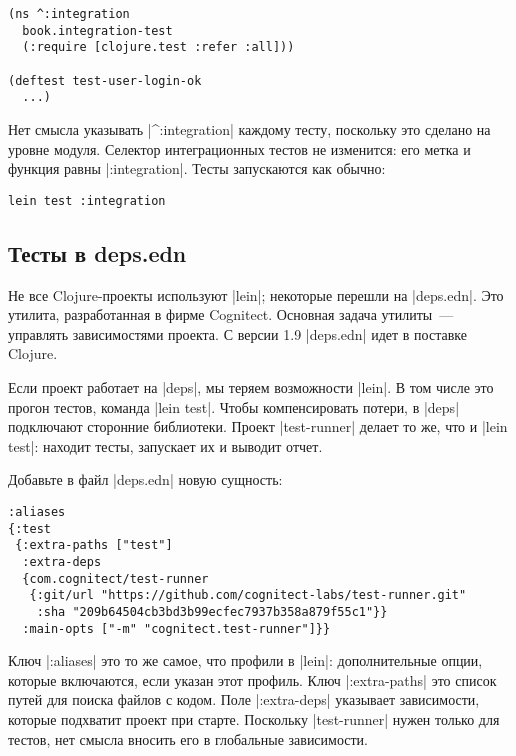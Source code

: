 \begin{verbatim}
(ns ^:integration
  book.integration-test
  (:require [clojure.test :refer :all]))

(deftest test-user-login-ok
  ...)
\end{verbatim}

Нет смысла указывать \spverb|^:integration| каждому тесту, поскольку это сделано
на уровне модуля. Селектор интеграционных тестов не изменится: его метка и
функция равны \spverb|:integration|. Тесты запускаются как обычно:

\begin{verbatim}
lein test :integration
\end{verbatim}

\subsection{Тесты в deps.edn}

Не все Clojure-проекты используют \spverb|lein|; некоторые перешли на
\spverb|deps.edn|. Это утилита,
разработанная в фирме Cognitect. Основная задача утилиты~--- управлять
зависимостями проекта. С версии 1.9 \spverb|deps.edn| идет в поставке Clojure.

Если проект работает на \spverb|deps|, мы теряем возможности \spverb|lein|. В
том числе это прогон тестов, команда \spverb|lein test|. Чтобы компенсировать
потери, в \spverb|deps| подключают сторонние библиотеки. Проект
\spverb|test-runner|
делает то же, что и \spverb|lein test|: находит тесты, запускает их и выводит
отчет.

Добавьте в файл \spverb|deps.edn| новую сущность:

\begin{verbatim}
:aliases
{:test
 {:extra-paths ["test"]
  :extra-deps
  {com.cognitect/test-runner
   {:git/url "https://github.com/cognitect-labs/test-runner.git"
    :sha "209b64504cb3bd3b99ecfec7937b358a879f55c1"}}
  :main-opts ["-m" "cognitect.test-runner"]}}
\end{verbatim}

Ключ \spverb|:aliases| это то же самое, что профили в \spverb|lein|:
дополнительные опции, которые включаются, если указан этот профиль. Ключ
\spverb|:extra-paths| это список путей для поиска файлов с кодом. Поле
\spverb|:extra-deps| указывает зависимости, которые подхватит проект при
старте. Поскольку \spverb|test-runner| нужен только для тестов, нет смысла
вносить его в глобальные зависимости.

